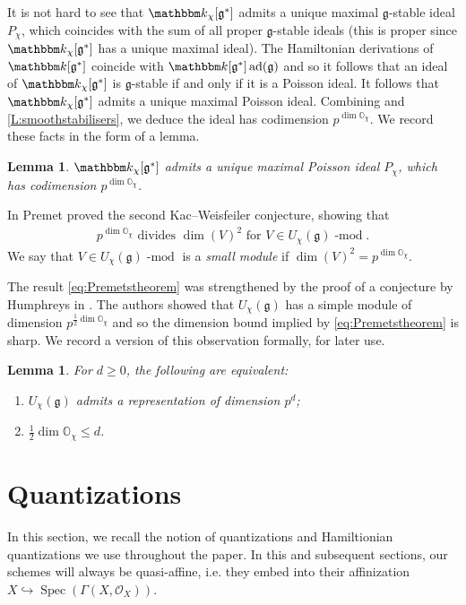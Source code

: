 \documentclass[twoside,12pt,reqno]{amsart}
\newtheorem{Lemma}[Theorem]{Lemma}
\theoremstyle{remark}
\numberwithin{equation}{section}
\def\k{{\mathbbm k}}
\def\lmod{\!\operatorname{-mod}}
\def\ad{\operatorname{ad}}
\def\Spec{\operatorname{Spec}}
\def\O{{\mathbb O}}
\def\g{{\mathfrak g}}
\def\Oc{\mathcal{O}}
\begin{document}
It is not hard to see that $\k_\chi[\g^*]$ admits a unique maximal $\g$-stable ideal $P_\chi$, which coincides with the sum of all proper $\g$-stable ideals (this is proper since $\k_\chi[\g^*]$ has a unique maximal ideal). The Hamiltonian derivations of $\k[\g^*]$ coincide with $\k[\g^*] \ad(\g)$ and so it follows that an ideal of $\k_\chi[\g^*]$ is $\g$-stable if and only if it is a Poisson ideal. It follows that $\k_\chi[\g^*]$ admits a unique maximal Poisson ideal. Combining \cite[Proposition~3.4]{PSk} and \eqref{L:smoothstabilisers}, we deduce the ideal has codimension $p^{\dim \O_\chi}$. We record these facts in the form of a lemma.

\begin{Lemma}
\label{L:PremetSkryabin}
$\k_\chi[\g^*]$ admits a unique maximal Poisson ideal $P_\chi$, which has codimension $p^{\dim \O_\chi}$.
\end{Lemma}

In \cite{PrKW} Premet proved the second Kac--Weisfeiler conjecture, showing that
\begin{eqnarray}
\label{eq:Premetstheorem}
p^{\dim \O_\chi} \text{ divides } \dim(V)^2 \text{ for } V \in U_\chi(\g)\lmod.
\end{eqnarray}
We say that $V\in U_\chi(\g)\lmod$ is a {\it small module} if $\dim(V)^2 = p^{\dim \O_\chi}$.

The result \eqref{eq:Premetstheorem} was strengthened by the proof of a conjecture by Humphreys in \cite{PT20}. The authors showed that $U_\chi(\g)$ has a simple module of dimension $p^{\frac{1}{2}\dim \O_\chi}$ and so the dimension bound implied by \eqref{eq:Premetstheorem} is sharp. We record a version of this observation formally, for later use.
\begin{Lemma}
\label{L:KW+Humphreys}
For $d \ge 0$, the following are equivalent:
\begin{enumerate}
    \item $U_\chi(\g)$ admits a representation of dimension $p^d$;
    \item $\frac{1}{2}\dim \O_\chi \le d$.
\end{enumerate}
\end{Lemma}

\section{Quantizations}\label{s:prelimquants}
In this section, we recall the notion of quantizations and Hamiltionian quantizations we use throughout the paper. In this and subsequent sections, our schemes will always be quasi-affine, i.e. they  embed into their affinization $X \hookrightarrow \Spec(\Gamma(X,\Oc_X))$. 
\end{document}
